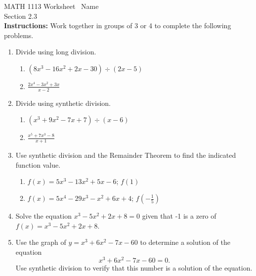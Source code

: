 \documentclass[11pt]{article}
\begin{document}
\noindent MATH 1113   \quad\quad\quad\quad\quad Worksheet \quad\quad\quad\quad\quad\   Name \underline{\phantom{alphabetsoupismyveryveryfavorite}}\\ 
\noindent Section 2.3 \\




\noindent \textbf{Instructions:}  Work together in groups of  3 or 4 to complete the following problems.\\

\begin{enumerate}



\item Divide using long division.
\begin{enumerate}
\item $(8x^3-16x^2+2x-30)\div (2x-5)$
\vfill

\item $\displaystyle \frac{2x^4-3x^2+3x}{x-2}$
\vfill

\end{enumerate}

\newpage


\item Divide using synthetic division.

\begin{enumerate}

\item $(x^3+9x^2-7x+7)\div (x-6)$
\vfill
\item $\displaystyle \frac{x^5+7x^3-8}{x+1}$
\vfill

\end{enumerate}

\item Use synthetic division and the Remainder Theorem to find the indicated function value.
\begin{enumerate}
\item $f(x)=5x^3-13x^2+5x-6$; $f(1)$
\vfill
\item $f(x)=5x^4-29x^3-x^2+6x+4$; $\displaystyle f(-\frac{1}{5})$
\end{enumerate}

\vfill

\newpage
\item Solve the equation $x^3-5x^2+2x+8=0$ given that -1 is a zero of $f(x)=x^3-5x^2+2x+8$.

\vfill


\item Use the graph of $y=x^3+6x^2-7x-60$ to determine a solution of
  the equation
  $$x^3+6x^2-7x-60=0.$$
  Use synthetic division to verify that this number is a solution of
  the equation.


\end{enumerate}
\end{document}
